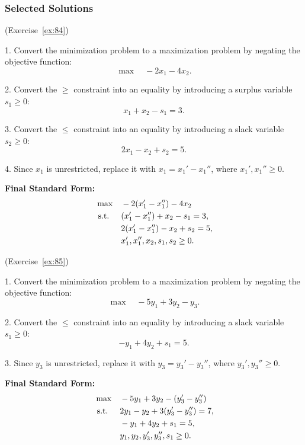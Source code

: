 \subsubsection*{Selected Solutions}

\begin{solution}(Exercise~\ref{ex:84})

1. Convert the minimization problem to a maximization problem by negating the objective function:
   \[
   \max \quad -2x_1 - 4x_2.
   \]

2. Convert the \( \geq \) constraint into an equality by introducing a surplus variable \( s_1 \geq 0 \):
   \[
   x_1 + x_2 - s_1 = 3.
   \]

3. Convert the \( \leq \) constraint into an equality by introducing a slack variable \( s_2 \geq 0 \):
   \[
   2x_1 - x_2 + s_2 = 5.
   \]

4. Since \( x_1 \) is unrestricted, replace it with \( x_1 = x_1' - x_1'' \), where \( x_1', x_1'' \geq 0 \).

\textbf{Final Standard Form:}
\[
\begin{aligned}
    \max \quad & -2(x_1' - x_1'') - 4x_2 \\
    \text{ s.t. } \quad
    & (x_1' - x_1'') + x_2 - s_1 = 3, \\
    & 2(x_1' - x_1'') - x_2 + s_2 = 5, \\
    & x_1', x_1'', x_2, s_1, s_2 \geq 0.
\end{aligned}
\]
\end{solution}
\vspace{1cm}

\begin{solution}(Exercise~\ref{ex:85})

1. Convert the minimization problem to a maximization problem by negating the objective function:
   \[
   \max \quad -5y_1 + 3y_2 - y_3.
   \]

2. Convert the \( \leq \) constraint into an equality by introducing a slack variable \( s_1 \geq 0 \):
   \[
   -y_1 + 4y_2 + s_1 = 5.
   \]

3. Since \( y_3 \) is unrestricted, replace it with \( y_3 = y_3' - y_3'' \), where \( y_3', y_3'' \geq 0 \).

\textbf{Final Standard Form:}
\[
\begin{aligned}
    \max \quad & -5y_1 + 3y_2 - (y_3' - y_3'') \\
    \text{ s.t. } \quad
    & 2y_1 - y_2 + 3(y_3' - y_3'') = 7, \\
    & -y_1 + 4y_2 + s_1 = 5, \\
    & y_1, y_2, y_3', y_3'', s_1 \geq 0.
\end{aligned}
\]
\end{solution}
\vspace{1cm}

